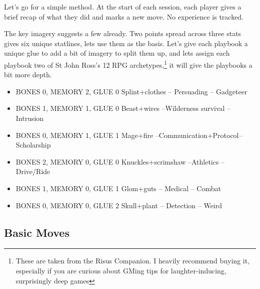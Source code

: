  Let's go for a simple method. At the start of each session, each player gives a brief recap of what they did and marks a new move. No experience is tracked.

 The key imagery suggests a few already. Two points spread across three stats gives six unique statlines, lets use them as the basis. Let's give each playbook a unique glue to add a bit of imagery to split them up, and lets assign each playbook two of St John Ross's 12 RPG archetypes,\footnote{These are taken from the Risus Companion. I heavily recommend buying it, especially if you are curious about GMing tips for laughter-inducing, surprisingly deep games} it will give the playbooks a bit more depth.

\begin{itemize}
\item BONES 0, MEMORY 2, GLUE 0  
\myitemend Splint+clothes  	--	Persuading			--		Gadgeteer
\item BONES 1, MEMORY 1, GLUE 0  
\myitemend Beast+wires			--Wilderness survival  --		Intrusion
\item BONES 0, MEMORY 1, GLUE 1  
\myitemend Mage+fire				--Communication+Protocol--	Scholarship
\item BONES 2, MEMORY 0, GLUE 0  
\myitemend Knuckles+scrimshaw  --Athletics		--			Drive/Ride
\item BONES 1, MEMORY 0, GLUE 1  
\myitemend Glom+guts			--	Medical		--				Combat
\item BONES 0, MEMORY 0, GLUE 2  
\myitemend Skull+plant			--	Detection	--				Weird
\end{itemize}

\subsection{Basic Moves}

